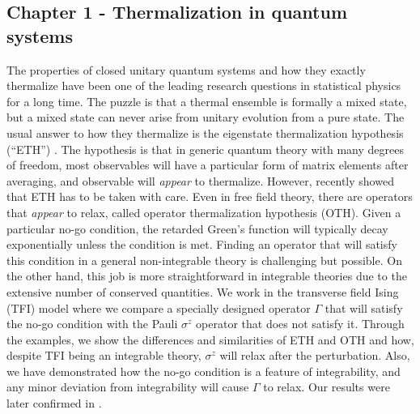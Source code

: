\subsection{Chapter 1 - Thermalization in quantum systems}
The properties of closed unitary quantum systems and how they exactly thermalize have been one of the leading research questions in statistical physics for a long time. The puzzle is that a thermal ensemble is formally a mixed state, but a mixed state can never arise from unitary evolution from a pure state. The usual answer to how they thermalize is the eigenstate thermalization hypothesis (``ETH'') \cite{srednickiETF}. The hypothesis is that in generic quantum theory with many degrees of freedom, most observables will have a particular form of matrix elements after averaging, and observable will \textit{appear} to thermalize. However, recently \cite{OTHpaper} showed that ETH has to be taken with care. Even in free field theory, there are operators that \textit{appear} to relax, called operator thermalization hypothesis (OTH). Given a particular no-go condition, the retarded Green's function will typically decay exponentially unless the condition is met. Finding an operator that will satisfy this condition in a general non-integrable theory is challenging but possible. On the other hand, this job is more straightforward in integrable theories due to the extensive number of conserved quantities. We work in the transverse field Ising (TFI) model where we compare a specially designed operator $\Gamma$ that will satisfy the no-go condition with the Pauli $\sigma^z$ operator that does not satisfy it. Through the examples, we show the differences and similarities of ETH and OTH and how, despite TFI being an integrable theory, $\sigma^z$ will relax after the perturbation. Also, we have demonstrated how the no-go condition is a feature of integrability, and any minor deviation from integrability will cause $\Gamma$ to relax. Our results were later confirmed in \cite{likeOurETH}.  

